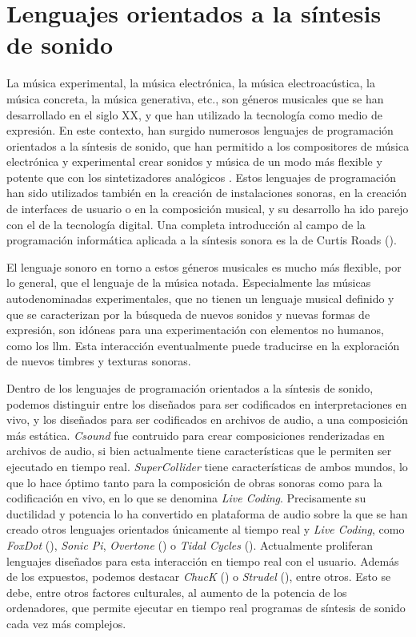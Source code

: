 \section{Lenguajes orientados a la síntesis de sonido}

La música experimental, la música electrónica, la música electroacústica, la música concreta, la música generativa, etc., son géneros musicales que se han desarrollado en el siglo XX, y que han utilizado la tecnología como medio de expresión. En este contexto, han surgido numerosos lenguajes de programación orientados a la síntesis de sonido, que han permitido a los compositores de música electrónica y experimental crear sonidos y música de un modo más flexible y potente que con los sintetizadores analógicos . Estos lenguajes de programación han sido utilizados también en la creación de instalaciones sonoras, en la creación de interfaces de usuario o en la composición musical, y su desarrollo ha ido parejo con el de la tecnología digital. Una completa introducción al campo de la programación informática aplicada a la síntesis sonora es la de Curtis Roads (\citeyear{roadsComputerMusicTutorial1996}).

El lenguaje sonoro en torno a estos géneros musicales es mucho más flexible, por lo general, que el lenguaje de la música notada. Especialmente las músicas autodenominadas experimentales, que no tienen un lenguaje musical definido y que se caracterizan por la búsqueda de nuevos sonidos y nuevas formas de expresión, son idóneas para una experimentación con elementos no humanos, como los \gls{llm}. Esta interacción eventualmente puede traducirse en la exploración de nuevos timbres y texturas sonoras.

Dentro de los lenguajes de programación orientados a la síntesis de sonido, podemos distinguir entre los diseñados para ser codificados en interpretaciones en vivo, y los diseñados para ser codificados en archivos de audio, a una composición más estática. \textit{Csound} \citep{boulangerCsoundBookPerspectives2000} fue contruido para crear composiciones renderizadas en archivos de audio, si bien actualmente tiene características que le permiten ser ejecutado en tiempo real. \textit{SuperCollider} \citep{wilsonSuperColliderBook2011a} tiene características de ambos mundos, lo que lo hace óptimo tanto para la composición de obras sonoras como para la codificación en vivo, en lo que se denomina \textit{Live Coding}. Precisamente su ductilidad y potencia lo ha convertido en plataforma de audio sobre la que se han creado otros lenguajes orientados únicamente al tiempo real y \textit{Live Coding}, como \textit{FoxDot} (\citeyear{kirkbrideQirkyFoxDot2023}), \textit{Sonic Pi}, \textit{Overtone} (\citeyear{OvertoneCollaborativeProgrammable}) o \textit{Tidal Cycles} (\citeyear{LiveCodeTidal}). Actualmente proliferan lenguajes diseñados para esta interacción en tiempo real con el usuario. Además de los expuestos, podemos destacar \textit{ChucK} (\citeyear{teamChucKStronglyTimedMusic}) o \textit{Strudel} (\citeyear{StrudelREPL}), entre otros. Esto se debe, entre otros factores culturales, al aumento de la potencia de los ordenadores, que permite ejecutar en tiempo real programas de síntesis de sonido cada vez más complejos.

